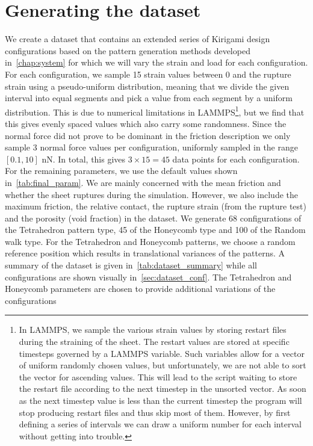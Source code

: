 \section{Generating the dataset}
We create a dataset that contains an extended series of Kirigami design
configurations based on the pattern generation methods developed
in~\cref{chap:system} for which we will vary the strain and load for each
configuration. For each configuration, we sample 15 strain values between 0 and
the rupture strain using a pseudo-uniform distribution, meaning that we divide
the given interval into equal segments and pick a value from each segment by a
uniform distribution. This is due to numerical limitations in LAMMPS\footnote{In
LAMMPS, we sample the various strain values by storing restart files during the
straining of the sheet. The restart values are stored at specific timesteps
governed by a LAMMPS variable. Such variables allow for a vector of uniform
randomly chosen values, but unfortunately, we are not able to sort the vector
for ascending values. This will lead to the script waiting to store the restart
file according to the next timestep in the unsorted vector. As soon as the next
timestep value is less than the current timestep the program will stop producing
restart files and thus skip most of them. However, by first defining a series of
intervals we can draw a uniform number for each interval without getting into
trouble.}, but we find that this gives evenly spaced values which also carry
some randomness. Since the normal force did not prove to be dominant in the
friction description we only sample 3 normal force values per configuration,
uniformly sampled in the range $[0.1, 10]$ nN. In total, this gives $3\times 15
= 45$ data points for each configuration. For the remaining parameters, we use
the default values shown in~\cref{tab:final_param}. We are mainly concerned with
the mean friction and whether the sheet ruptures during the simulation. However,
we also include the maximum friction, the relative contact, the rupture strain
(from the rupture test) and the porosity (void fraction) in the dataset. We
generate 68 configurations of the Tetrahedron pattern type, 45 of the Honeycomb
type and 100 of the Random walk type. For the Tetrahedron and Honeycomb
patterns, we choose a random reference position which results in translational
variances of the patterns. A summary of the dataset is given
in~\cref{tab:dataset_summary} while all configurations are shown visually
in~\cref{sec:dataset_conf}. The Tetrahedron and Honeycomb
parameters are chosen to provide additional variations of the configurations
